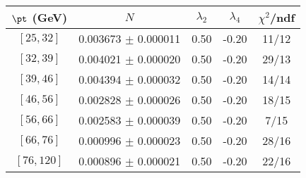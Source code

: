 \begin{tabular}{c||c|c|c|c}
$\pt$ (GeV) & $N$ & $\lambda_{2}$ & $\lambda_4$  & $\chi^2$/ndf  \\
\hline
$[25, 32]$ & 0.003673 $\pm$ 0.000011 & 0.50 & -0.20 & 11/12\\
$[32, 39]$ & 0.004021 $\pm$ 0.000020 & 0.50 & -0.20 & 29/13\\
$[39, 46]$ & 0.004394 $\pm$ 0.000032 & 0.50 & -0.20 & 14/14\\
$[46, 56]$ & 0.002828 $\pm$ 0.000026 & 0.50 & -0.20 & 18/15\\
$[56, 66]$ & 0.002583 $\pm$ 0.000039 & 0.50 & -0.20 & 7/15\\
$[66, 76]$ & 0.000996 $\pm$ 0.000023 & 0.50 & -0.20 & 28/16\\
$[76, 120]$ & 0.000896 $\pm$ 0.000021 & 0.50 & -0.20 & 22/16\\
\end{tabular}
